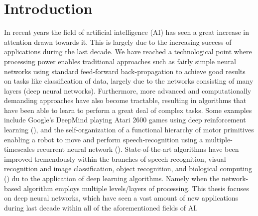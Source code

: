
\chapter{Introduction}

In recent years the field of artificial intelligence (AI) has seen a great increase in attention drawn towards it. This is largely due to the increasing success of applications during the last decade. We have reached a technological point where processing power enables traditional approaches such as fairly simple neural networks using standard feed-forward back-propagation to achieve good results on tasks like classification of data, largely due to the networks consisting of many layers (deep neural networks). Furthermore, more advanced and computationally demanding approaches have also become tractable, resulting in algorithms that have been able to learn to perform a great deal of complex tasks. Some examples include Google's DeepMind playing Atari 2600 games using deep reinforcement learning (\cite{Mnih2015}), and the self-organization of a functional hierarchy of motor primitives enabling a robot to move and perform speech-recognition using a multiple-timescales recurrent neural network (\cite{Tani2014}). State-of-the-art algorithms have been improved tremendously within the branches of speech-recognition, visual recognition and image classification, object recognition, and biological computing (\cite{LeCun2015}) du to the application of deep learning algorithms. Namely when the network-based algorithm employs multiple levels/layers of processing. This thesis focuses on deep neural networks, which have seen a vast amount of new applications during last decade within all of the aforementioned fields of AI.
\\

